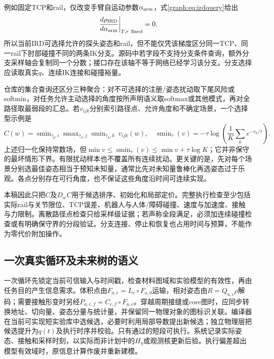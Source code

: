 \documentclass[11pt,a4paper]{article}
\numberwithin{equation}{section}
\theoremstyle{definition}
\begin{document}
例如固定TCP和rail，仅改变手臂自运动参数$\alpha_{\rm arm}$，式\eqref{graph:eq:irdquery}给出
\begin{equation}
 \left.\frac{d\rho_{\rm IRD}}{d\alpha_{\rm arm}}\right|_{T,r\ {\rm fixed}}=0.
 \label{graph:eq:ird-null}
\end{equation}
所以当前IRD可选择允许的探头姿态和rail，但不能仅凭该梯度区分同一TCP、同一rail下肘部碰撞不同的两条IK分支。源码中若字段不支持分支条件查询，额外分支采样轴会复制同一个分数；接口存在该轴不等于网络已经学习该分支。分支选择应读取真实$q$、连续IK连接和碰撞裕量。

仓库的集合查询还区分三种聚合：对不可选择的注册/姿态扰动取下尾风险或softmin，对任务允许主动选择的角度按所声明语义取softmax或其他模式，再对全路径取最弱段的汇总。若$v_{ijk}$分别索引路径点、允许角度和不确定场景，一个选择型示例是
\begin{equation}
 C(w)=\operatorname{smin}_{\tau_p,i}
 \operatorname{smax}_{\tau_a,j}
 \operatorname{smin}_{\tau_u,k}\ v_{ijk}(w),
 \quad
 \operatorname{smin}_{\tau}(v)=-\tau\log\!\left(\frac1K\sum_k e^{-v_k/\tau}\right).
 \label{graph:eq:irdaggregate}
\end{equation}
上述归一化保持常数场，但$\min v\le\operatorname{smin}_{\tau}(v)\le\min v+\tau\log K$；它并非保守的最坏情形下界。有限扰动样本也不覆盖所有连续扰动。更关键的是，先对每个场景分别选最佳姿态相当于预知未知量，通常比先对未知量鲁棒化再选姿态过于乐观。各点分别存在可行角度，也不保证这些角度沿时间可连续实现。

本稿因此只把$C$及$D_wC$用于候选排序、初始化和局部定价。完整执行检查至少包括实际rail与关节限位、TCP误差、机器人与人体/障碍碰撞、速度与加速度、接触与力限制。离散路径点检查只给采样级证据；若声称全段满足，必须加连续碰撞检查或有明确保守界的分段验证。分支连接、停止和恢复也占用时间与预算，不能作为零代价附加操作。

\subsection{一次真实循环及未来树的语义}

一次循环先锁定当前可信输入与时间戳，检查材料图域和实验模型的有效性，再由任务目的产生信息需求。体积点由$F_{a,c}=L_c\circ F_{a,0}$运输，相对姿态由$R=Q_{a,c}\rho$解码；需要接触形变时另经$P_{a,c,f}=C_{c,f}\circ F_{a,c}$。穿越周期接缝或core图时，应同步转换地址、切向量、姿态分量与统计量，并保留同一物理对象的图标识关联。编译器在当前可实现短实验库中选候选，必要时利用局部导数提出新候选；独立物理层把候选提升为$q(t)$及执行时序并校验。只有通过的短段可执行。系统记录实际姿态、接触和采样时刻，以实际而非计划中的$H_\eta$或观测核更新后验。执行偏差超出模型有效域时，原信息计算作废并重新建模。
\end{document}
